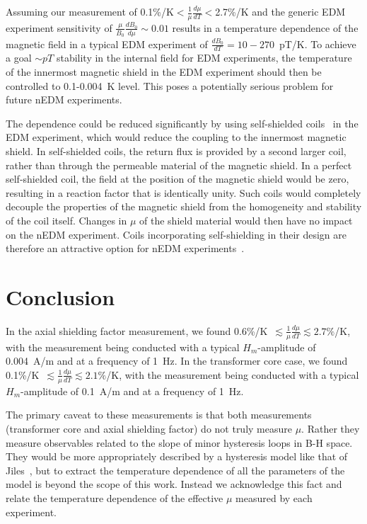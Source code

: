\documentclass[review]{elsarticle}
\begin{document}
Assuming our measurement of
0.1\%/K$<\frac{1}{\mu}\frac{d\mu}{dT}<$2.7\%/K and the generic EDM
experiment sensitivity of $\frac{\mu}{B_0}\frac{dB_0}{d\mu}\sim 0.01$
results in a temperature dependence of the magnetic field in a typical
EDM experiment of $\frac{dB_0}{dT}=10-270$~pT/K.  To achieve a goal
$\sim pT$ stability in the internal field for EDM experiments, the
temperature of the innermost magnetic shield in the EDM experiment
should then be controlled to 0.1-0.004~K level.  This poses a
potentially serious problem for future nEDM experiments.

The dependence could be reduced significantly by using self-shielded
coils~\cite{bib:cpviolwithoutstrangeness,bib:bidinosti}
in the EDM experiment, which would reduce the coupling to the
innermost magnetic shield.  In self-shielded coils, the return flux is
provided by a second larger coil, rather than through the permeable
material of the magnetic shield.  In a perfect self-shielded coil, the
field at the position of the magnetic shield would be zero, resulting
in a reaction factor that is identically unity.  Such coils would
completely decouple the properties of the magnetic shield from the
homogeneity and stability of the coil itself.  Changes in $\mu$ of the
shield material would then have no impact on the nEDM experiment.
Coils incorporating self-shielding in their design are therefore an
attractive option for nEDM
experiments~\cite{bib:cpviolwithoutstrangeness}.



\section{Conclusion}

In the axial shielding factor measurement, we found
0.6\%/K~$\lesssim\frac{1}{\mu}\frac{d\mu}{dT}\lesssim 2.7\%$/K, with
the measurement being conducted with a typical $H_m$-amplitude of
0.004~A/m and at a frequency of 1~Hz.  In the transformer core case,
we found 0.1\%/K~$\lesssim\frac{1}{\mu}\frac{d\mu}{dT}\lesssim
2.1\%$/K, with the measurement being conducted with a typical
$H_m$-amplitude of 0.1~A/m and at a frequency of 1~Hz.

The primary caveat to these measurements is that both measurements
(transformer core and axial shielding factor) do not truly measure
$\mu$.  Rather they measure observables related to the slope of minor
hysteresis loops in B-H space.  They would be more appropriately
described by a hysteresis model like that of Jiles~\cite{bib:jiles},
but to extract the temperature dependence of all the parameters of the
model is beyond the scope of this work.  Instead we acknowledge this
fact and relate the temperature dependence of the effective $\mu$
measured by each experiment.
\end{document}
